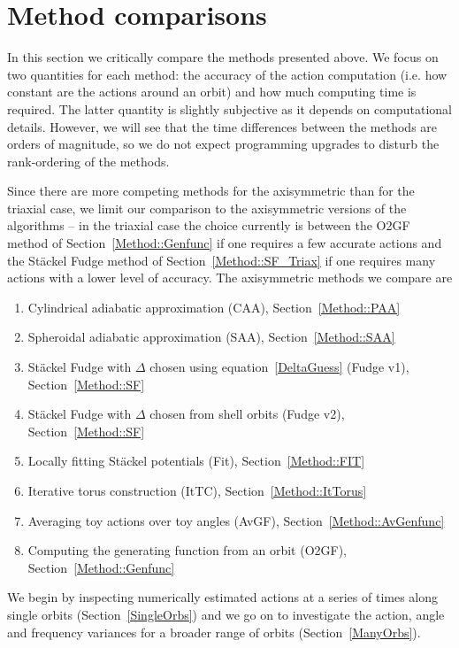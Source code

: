 \documentclass[useAMS,usenatbib,fleqn,a4paper]{mn2e}
\begin{document}
\section{Method comparisons}\label{Sect::MethodComparison}

In this section we critically compare the methods presented
above. We focus on two quantities for each method: the accuracy of
the action computation (i.e. how constant are the actions around an orbit)
and how much computing time is required. The latter quantity is
slightly subjective as it depends on  computational
details. However, we will see that the time differences between the methods
are orders of magnitude, so we do not expect programming upgrades to disturb
the rank-ordering of the methods.

Since there are more competing methods for the
axisymmetric than for the triaxial case,
we limit our comparison to the axisymmetric versions of the
algorithms -- in the triaxial case the choice currently is between
the O2GF method of Section~\ref{Method::Genfunc} if one
requires a few accurate actions and the St\"ackel Fudge method of
Section~\ref{Method::SF_Triax} if one requires many actions with a lower
level of accuracy. The  axisymmetric methods we compare are
 \begin{enumerate}
\item Cylindrical adiabatic approximation (CAA), Section~\ref{Method::PAA}
\item Spheroidal adiabatic approximation (SAA), Section~\ref{Method::SAA}
\item St\"ackel Fudge with $\Delta$ chosen using equation~\eqref{DeltaGuess} (Fudge v1), Section~\ref{Method::SF}
\item St\"ackel Fudge with $\Delta$ chosen from shell orbits (Fudge v2), Section~\ref{Method::SF}
\item Locally fitting St\"ackel potentials (Fit), Section~\ref{Method::FIT}
\item Iterative torus construction (ItTC), Section~\ref{Method::ItTorus}
\item Averaging toy actions over toy angles (AvGF), Section~\ref{Method::AvGenfunc}
\item Computing the generating function  from an orbit (O2GF), Section~\ref{Method::Genfunc}
\end{enumerate}
 We begin by inspecting numerically estimated actions at a series of times
along single orbits (Section~\ref{SingleOrbs}) and we go on to investigate
the action, angle and frequency variances for a broader range of orbits
(Section~\ref{ManyOrbs}).
\end{document}
